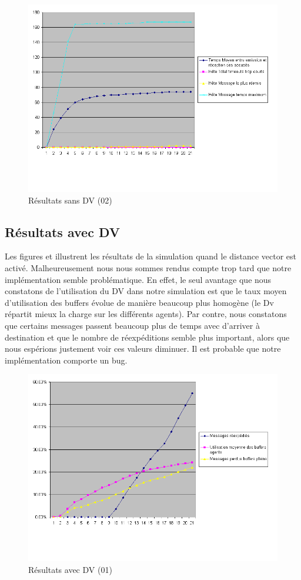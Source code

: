 \documentclass[a4paper,11pt]{article}
\begin{document}
\begin{figure}[h!t]
  \centering
    \includegraphics[scale=0.55]{sansdv2}
  \caption{Résultats sans DV (02)}
  \label{fig:sansdv02}
\end{figure}


\subsection{Résultats avec DV}
Les figures  et  illustrent les résultats de la simulation quand le distance vector est activé. Malheureusement nous nous sommes rendus compte trop tard que notre implémentation semble problématique. En effet, le seul avantage que nous constatons de l'utilisation du DV dans notre simulation est que le taux moyen d'utilisation des buffers évolue de manière beaucoup plus homogène (le Dv répartit mieux la charge sur les différents agents). Par contre, nous constatons que certains messages passent beaucoup plus de temps avec d'arriver à destination et que le nombre de réexpéditions semble plus important, alors que nous espérions justement voir ces valeurs diminuer. Il est probable que notre implémentation comporte un bug.

\begin{figure}[h!t]
  \centering
    \includegraphics[scale=0.55]{avecdv1}
  \caption{Résultats avec DV (01)}
  \label{fig:avecdv01}
\end{figure}
\end{document}
